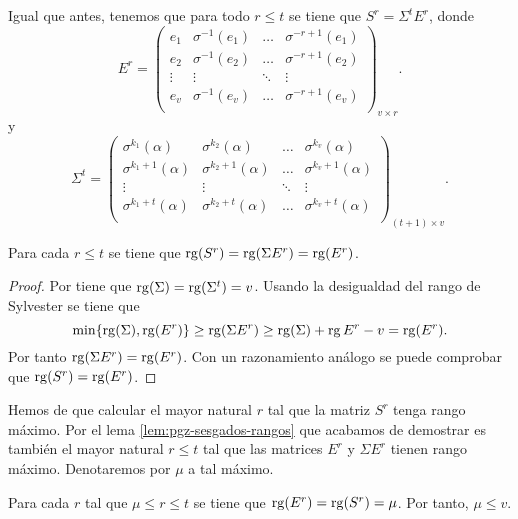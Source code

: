 Igual que antes, tenemos que para todo \(r \leq t\) se tiene que \(S^r = \Sigma^tE^r\), donde 
\[
  E^r = \begin{pmatrix}
    e_1 & \sigma^{-1}(e_1) & \dots & \sigma^{-r + 1}(e_1)\\
    e_2 & \sigma^{-1}(e_2) & \dots & \sigma^{-r + 1}(e_2)\\
    \vdots & \vdots & \ddots & \vdots \\
    e_v & \sigma^{-1}(e_v) & \dots & \sigma^{-r + 1}(e_v)\\
  \end{pmatrix}_{v \times r}.
\]
y
\[
  \Sigma^t = \begin{pmatrix}
    \sigma^{k_1}(\alpha) & \sigma^{k_2}(\alpha) & \dots & \sigma^{k_v}(\alpha)\\
    \sigma^{k_1 + 1}(\alpha) & \sigma^{k_2 + 1}(\alpha) & \dots & \sigma^{k_v + 1}(\alpha)\\
    \vdots & \vdots & \ddots & \vdots \\
    \sigma^{k_1 + t}(\alpha) & \sigma^{k_2 + t}(\alpha) & \dots & \sigma^{k_v + t}(\alpha)\\
  \end{pmatrix}_{(t+1)\times v}.
\]

\begin{lemma}
  \label{lem:pgz-sesgados-rangos}
  Para cada \(r \leq t\) se tiene que \(\operatorname{rg}(S^r) = \operatorname{rg}(\Sigma E^r) = \operatorname{rg}(E^r)\).
\end{lemma}

\begin{proof}
  Por \parencite[Lema 2.1]{gomez-torrecillas_petersongorensteinzierler_2018} tiene que \(\operatorname{rg}(\Sigma) = \operatorname{rg}(\Sigma^t) = v\).
  Usando la desigualdad del rango de Sylvester se tiene que
  \[
    \min\{\operatorname{rg}(\Sigma), \operatorname{rg}(E^r)\} \geq \operatorname{rg}(\Sigma E^r) \geq \operatorname{rg}(\Sigma) + \operatorname{rg} E^r - v = \operatorname{rg}(E^r).
  \]
  Por tanto \(\operatorname{rg}(\Sigma E^r) = \operatorname{rg}(E^r)\).
  Con un razonamiento análogo se puede comprobar que \(\operatorname{rg}(S^r) = \operatorname{rg}(E^r)\).
\end{proof}

Hemos de que calcular el mayor natural \(r\) tal que la matriz \(S^r\) tenga rango máximo.
Por el lema \ref{lem:pgz-sesgados-rangos} que acabamos de demostrar es también el mayor natural \(r \leq t\) tal que las matrices \(E^r\) y \(\Sigma E^r\) tienen rango máximo.
Denotaremos por \(\mu\) a tal máximo.

\begin{lemma}
  \label{lem:pgz-sesgados-rango-mu}
  Para cada \(r\) tal que \(\mu \leq r \leq t\) se tiene que \(\operatorname{rg}(E^r) = \operatorname{rg}(S^r) = \mu\).
  Por tanto, \(\mu \leq v\).
\end{lemma}

